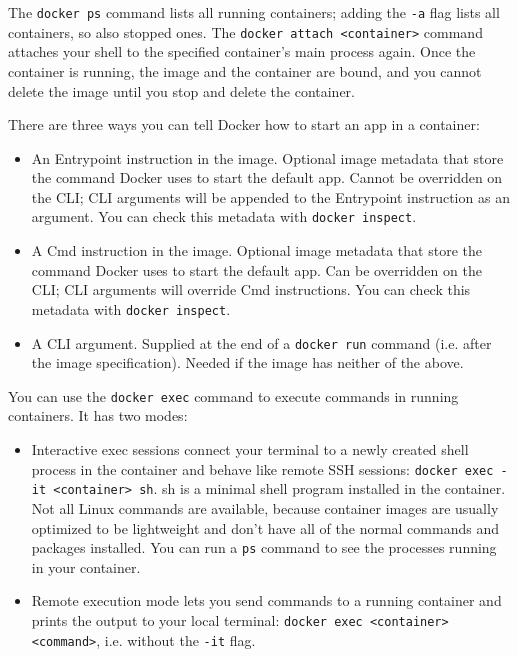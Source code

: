 \documentclass[8pt, table, xcdraw]{article}%
\begin{document}
The \lstinline{docker ps} command lists all running containers; adding the \lstinline{-a} flag lists all containers, so also stopped ones. The \lstinline{docker attach <container>} command attaches your shell to the specified container’s main process again. Once the container is running, the image and the container are bound, and you cannot delete the image until you stop and delete the container.

There are three ways you can tell Docker how to start an app in a container:

\begin{itemize}
    \item An Entrypoint instruction in the image. Optional image metadata that store the command Docker uses to start the default app. Cannot be overridden on the CLI; CLI arguments will be appended to the Entrypoint instruction as an argument. You can check this metadata with \lstinline{docker inspect}.
    \item A Cmd instruction in the image. Optional image metadata that store the command Docker uses to start the default app. Can be overridden on the CLI; CLI arguments will override Cmd instructions. You can check this metadata with \lstinline{docker inspect}.
    \item A CLI argument. Supplied at the end of a \lstinline{docker run} command (i.e. after the image specification). Needed if the image has neither of the above.
\end{itemize}

You can use the \lstinline{docker exec} command to execute commands in running containers. It has two modes:

\begin{itemize}
    \item Interactive exec sessions connect your terminal to a newly created shell process in the container and behave like remote SSH sessions: \lstinline{docker exec -it <container> sh}. sh is a minimal shell program installed in the container. Not all Linux commands are available, because container images are usually optimized to be lightweight and don’t have all of the normal commands and packages installed. You can run a \lstinline{ps} command to see the processes running in your container. 
    \item Remote execution mode lets you send commands to a running container and prints the output to your local terminal: \lstinline{docker exec <container> <command>}, i.e. without the \lstinline{-it} flag.
\end{itemize}
\end{document}
